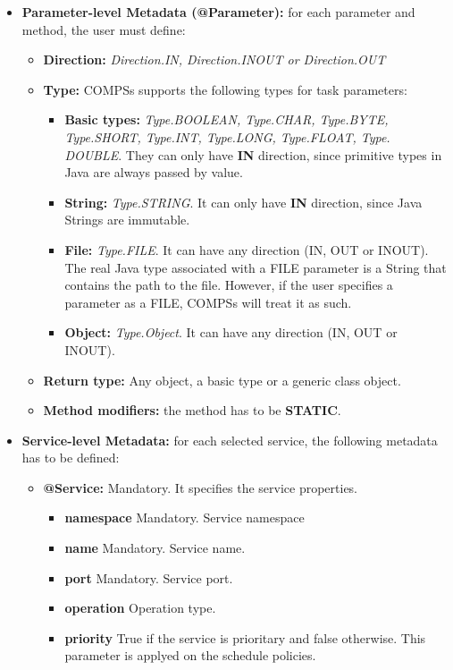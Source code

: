 \begin{itemize}
 \item {\bf Parameter-level Metadata (@Parameter):} for each parameter and method, the user must define:
       \begin{itemize}
        \item {\bf Direction:} {\it Direction.IN, Direction.INOUT or Direction.OUT}
        \item {\bf Type:} COMPSs supports the following types for task parameters:
              \begin{itemize}
               \item {\bf Basic types:} {\it Type.BOOLEAN, Type.CHAR, Type.BYTE, Type.SHORT, Type.INT, Type.LONG,
                     Type.FLOAT, Type. DOUBLE}. They can only have {\bf IN} direction, since primitive types in Java are
                     always passed by value.
               \item {\bf String:} {\it Type.STRING}. It can only have {\bf IN} direction, since Java Strings are immutable.
               \item {\bf File:} {\it Type.FILE}. It can have any direction (IN, OUT or INOUT). The real Java type associated
                     with a FILE parameter is a String that contains the path to the file. However, if the user specifies
                     a parameter as a FILE, COMPSs will treat it as such.
               \item {\bf Object:} {\it Type.Object}. It can have any direction (IN, OUT or INOUT).
              \end{itemize}
        \item {\bf Return type:} Any object, a basic type or a generic class object.
        \item {\bf Method modifiers:} the method has to be {\bf STATIC}.
       \end{itemize}

 \item \textbf{Service-level Metadata:} for each selected service, the following metadata has to be defined:
       \begin{itemize}
         \item \textbf{@Service:} Mandatory. It specifies the service properties. 
		\begin{itemize}
			\item \textbf{namespace} Mandatory. Service namespace
			\item \textbf{name} Mandatory. Service name.
			\item \textbf{port} Mandatory. Service port.
			\item \textbf{operation} Operation type. 
			\item \textbf{priority} True if the service is prioritary and false otherwise. This parameter is applyed 
			on the schedule policies. 
		\end{itemize}
	\end{itemize}
\end{itemize}

